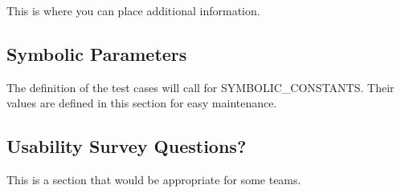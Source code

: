 \documentclass[12pt, titlepage]{article}
\begin{document}
This is where you can place additional information.

\subsection{Symbolic Parameters}

The definition of the test cases will call for SYMBOLIC\_CONSTANTS.
Their values are defined in this section for easy maintenance.

\subsection{Usability Survey Questions?}

This is a section that would be appropriate for some teams.
\end{document}
